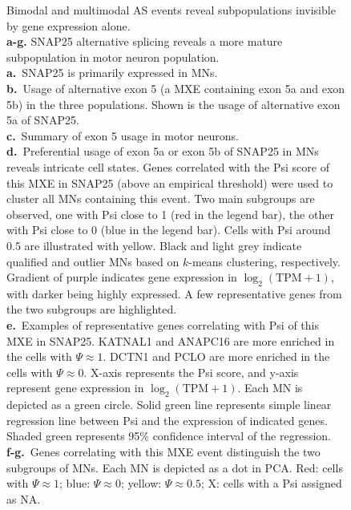 \clearpage
\thispagestyle{facingcaption}
\begin{figure}[h]
\captionsetup{labelformat=prev-page}
\caption[Bimodal and multimodal AS events reveal subpopulations invisible by gene expression alone.]{Bimodal and multimodal AS events reveal subpopulations invisible by gene expression alone.\\
\textbf{a-g.} SNAP25 alternative splicing reveals a more mature subpopulation in motor neuron population.\\
\textbf{a.}~SNAP25 is primarily expressed in MNs. \\
\textbf{b.}~Usage of alternative exon 5 (a MXE containing exon 5a and exon 5b) in the three populations. Shown is the usage of alternative exon 5a of SNAP25. \\
\textbf{c.}~Summary of exon 5 usage in motor neurons.\\
\textbf{d.}~Preferential usage of exon 5a or exon 5b of SNAP25 in MNs reveals intricate cell states. Genes correlated with the Psi score of this MXE in SNAP25 (above an empirical threshold) were used to cluster all MNs containing this event. Two main subgroups are observed, one with Psi close to 1 (red in the legend bar), the other with Psi close to 0 (blue in the legend bar). Cells with Psi around 0.5 are illustrated with yellow. Black and light grey indicate qualified and outlier MNs based on $k$-means clustering, respectively. Gradient of purple indicates gene expression in $\log_2(\text{TPM}+1)$, with darker being highly expressed. A few representative genes from the two subgroups are highlighted. \\
\textbf{e.}~Examples of representative genes correlating with Psi of this MXE in SNAP25. KATNAL1 and ANAPC16 are more enriched in the cells with $\Psi \approx 1$. DCTN1 and PCLO are more enriched in the cells with $\Psi \approx 0$. X-axis represents the Psi score, and y-axis represent gene expression in $\log_2(\text{TPM}+1)$. Each MN is depicted as a green circle. Solid green line represents simple linear regression line between Psi and the expression of indicated genes. Shaded green represents 95\% confidence interval of the regression.\\
\textbf{f-g.}~Genes correlating with this MXE event distinguish the two subgroups of MNs. Each MN is depicted as a dot in PCA.  Red: cells with $\Psi \approx 1$; blue: $\Psi \approx 0$; yellow: $\Psi \approx 0.5$; X: cells with a Psi assigned as NA.\\
}
\end{figure}
